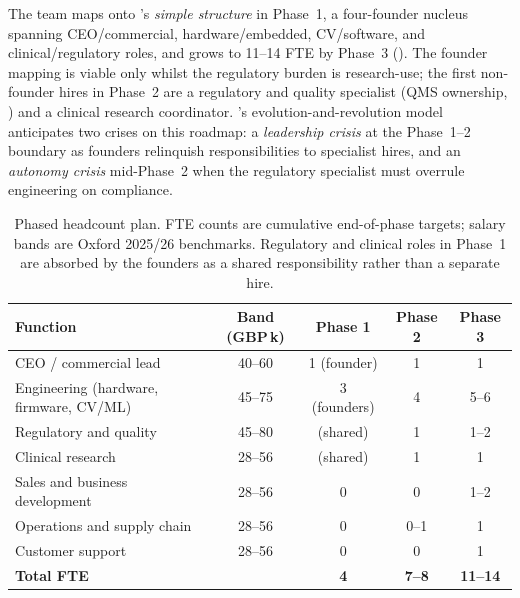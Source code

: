 The team maps onto \citet{mintzberg1979structuring}'s \textit{simple structure} in Phase~1, a four-founder nucleus spanning CEO/commercial, hardware/embedded, CV/software, and clinical/regulatory roles, and grows to 11--14 FTE by Phase~3 (). The founder mapping is viable only whilst the regulatory burden is research-use; the first non-founder hires in Phase~2 are a regulatory and quality specialist (QMS ownership, ) and a clinical research coordinator. \citet{greiner1998evolution}'s evolution-and-revolution model anticipates two crises on this roadmap: a \textit{leadership crisis} at the Phase~1--2 boundary as founders relinquish responsibilities to specialist hires, and an \textit{autonomy crisis} mid-Phase~2 when the regulatory specialist must overrule engineering on compliance.

\begin{table}[htbp]
    \centering
    \caption[Phased headcount plan]{Phased headcount plan. FTE counts are cumulative end-of-phase targets; salary bands are Oxford 2025/26 benchmarks. Regulatory and clinical roles in Phase~1 are absorbed by the founders as a shared responsibility rather than a separate hire.}
    \label{tab:ent-ops-headcount}
    \footnotesize
    \begin{tabular}{lcccc}
        \toprule
        \textbf{Function} & \textbf{Band (GBP\,k)} & \textbf{Phase 1} & \textbf{Phase 2} & \textbf{Phase 3} \\
        \midrule
        CEO / commercial lead                       & 40--60 & 1 (founder)  & 1     & 1     \\
        Engineering (hardware, firmware, CV/ML)     & 45--75 & 3 (founders) & 4     & 5--6  \\
        Regulatory and quality                      & 45--80 & (shared)     & 1     & 1--2  \\
        Clinical research                           & 28--56 & (shared)     & 1     & 1     \\
        Sales and business development              & 28--56 & 0            & 0     & 1--2  \\
        Operations and supply chain                 & 28--56 & 0            & 0--1  & 1     \\
        Customer support                            & 28--56 & 0            & 0     & 1     \\
        \midrule
        \textbf{Total FTE}                          &        & \textbf{4}   & \textbf{7--8} & \textbf{11--14} \\
        \bottomrule
    \end{tabular}
\end{table}

